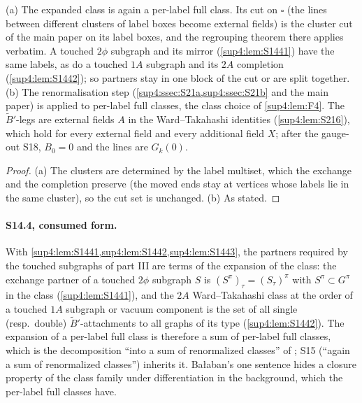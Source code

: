 \begin{lemma}\label{sup4:lem:S1443}
\textup{(a)} The expanded class is again a per-label full class. Its cut on $\square$ (the lines between different clusters of label boxes become external fields) is the cluster cut of the main paper on its label boxes, and the regrouping theorem there applies verbatim. A touched $2\phi$ subgraph and its mirror (\cref{sup4:lem:S1441}) have the same labels, as do a touched $1A$ subgraph and its $2A$ completion (\cref{sup4:lem:S1442}); so partners stay in one block of the cut or are split together. \textup{(b)} The renormalisation step (\cref{sup4:ssec:S21a,sup4:ssec:S21b} and the main paper) is applied to per-label full classes, the class choice of \cref{sup4:lem:F4}. The $\tilde B'$-legs are external fields $A$ in the Ward--Takahashi identities (\cref{sup4:lem:S216}), which hold for every external field and every additional field $X$; after the gauge-out S18, $B_0=0$ and the lines are $G_k(0)$.
\end{lemma}

\begin{proof}
(a) The clusters are determined by the label multiset, which the exchange and the completion preserve (the moved ends stay at vertices whose labels lie in the same cluster), so the cut set is unchanged. (b) As stated.
\end{proof}

\paragraph{S14.4, consumed form.} With \cref{sup4:lem:S1441,sup4:lem:S1442,sup4:lem:S1443}, the partners required by the touched subgraphs of part III are terms of the expansion of the class: the exchange partner of a touched $2\phi$ subgraph $S$ is $(S^\pi)_\tau=(S_\tau)^\pi$ with $S^\pi\subset G^\pi$ in the class (\cref{sup4:lem:S1441}), and the $2A$ Ward--Takahashi class at the order of a touched $1A$ subgraph or vacuum component is the set of all single (resp.\ double) $\tilde B'$-attachments to all graphs of its type (\cref{sup4:lem:S1442}). The expansion of a per-label full class is therefore a sum of per-label full classes, which is the decomposition ``into a sum of renormalized classes'' of \cite[p.~433]{Ba3}; S15 (``again a sum of renormalized classes'') inherits it. Ba{\l}aban's one sentence hides a closure property of the class family under differentiation in the background, which the per-label full classes have.
